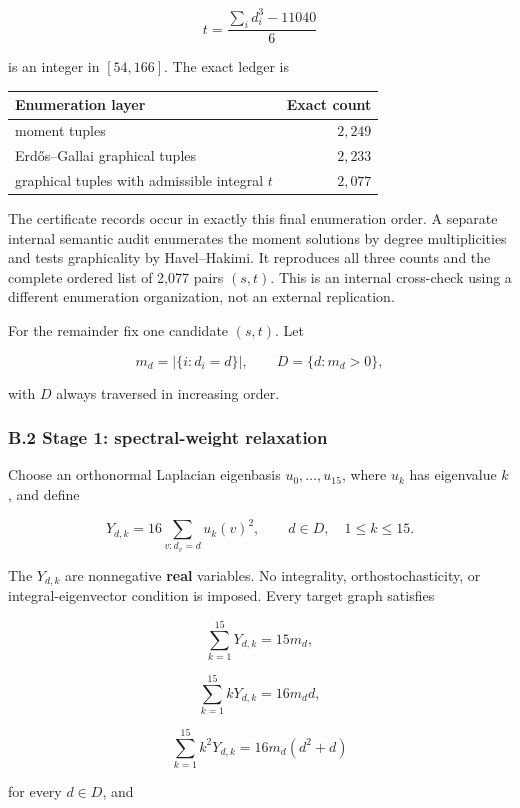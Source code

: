 \documentclass[
  english,
  11pt,
  a4paper,
]{article}
\newcounter{none} %
\begin{document}
\[
t=\frac{\sum_i d_i^3-11040}{6}
\tag{B.3}
\]

is an integer in \([54,166]\). The exact ledger is

{\def\LTcaptype{none} %
\begin{longtable}[]{@{}lr@{}}
\toprule\noalign{}
Enumeration layer & Exact count \\
\midrule\noalign{}
\endhead
\bottomrule\noalign{}
\endlastfoot
moment tuples & \(2{,}249\) \\
Erdős--Gallai graphical tuples & \(2{,}233\) \\
graphical tuples with admissible integral \(t\) & \(2{,}077\) \\
\end{longtable}
}

The certificate records occur in exactly this final enumeration order. A
separate internal semantic audit enumerates the moment solutions by
degree multiplicities and tests graphicality by Havel--Hakimi. It
reproduces all three counts and the complete ordered list of 2,077 pairs
\((s,t)\). This is an internal cross-check using a different enumeration
organization, not an external replication.

For the remainder fix one candidate \((s,t)\). Let

\[
m_d=|\{i:d_i=d\}|,\qquad
D=\{d:m_d>0\},
\tag{B.4}
\]

with \(D\) always traversed in increasing order.

\subsubsection{B.2 Stage 1: spectral-weight
relaxation}\label{b.2-stage-1-spectral-weight-relaxation}

Choose an orthonormal Laplacian eigenbasis \(u_0,\ldots,u_{15}\), where
\(u_k\) has eigenvalue \(k\), and define

\[
Y_{d,k}=16\sum_{v:d_v=d}u_k(v)^2,
\qquad d\in D,\quad 1\le k\le15.
\tag{B.5}
\]

The \(Y_{d,k}\) are nonnegative \textbf{real} variables. No integrality,
orthostochasticity, or integral-eigenvector condition is imposed. Every
target graph satisfies

\[
\sum_{k=1}^{15}Y_{d,k}=15m_d,
\tag{B.6}
\]

\[
\sum_{k=1}^{15}kY_{d,k}=16m_dd,
\tag{B.7}
\]

\[
\sum_{k=1}^{15}k^2Y_{d,k}=16m_d(d^2+d)
\tag{B.8}
\]

for every \(d\in D\), and
\end{document}
